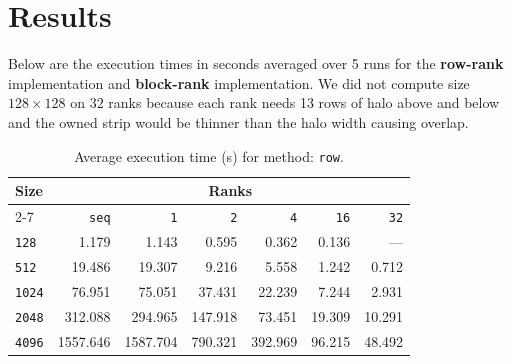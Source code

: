 \documentclass[11pt]{article}
\begin{document}
\section{Results}

Below are the execution times in seconds averaged over 5 runs for the \textbf{row-rank} implementation and \textbf{block-rank} implementation. We did not compute size $128 \times 128$ on $32$ ranks because each rank needs 13 rows of halo above and below and the owned strip would be thinner than the halo width causing overlap.

\begin{table}[H]
    \centering
    \begin{tabular}{|l|r|r|r|r|r|r|} \hline
        \cellcolor{blue!10}\textbf{Size} & \multicolumn{6}{c|}{\cellcolor{blue!10}\textbf{Ranks}} 
        \\ \cline{2-7}
        \cellcolor{blue!10} & \cellcolor{blue!20}\texttt{seq} & \cellcolor{blue!20}\texttt{1} & \cellcolor{blue!20}\texttt{2} & \cellcolor{blue!20}\texttt{4} & \cellcolor{blue!20}\texttt{16} & \cellcolor{blue!20}\texttt{32} \\ \hline
        \texttt{128}  & \cellcolor{red!20}1.179   & 1.143   & 0.595   & 0.362   & \cellcolor{green!20}0.136  & ---     \\ \hline
        \texttt{512}  & \cellcolor{red!20}19.486  & 19.307  & 9.216   & 5.558   & 1.242   & \cellcolor{green!20}0.712  \\ \hline
        \texttt{1024} & \cellcolor{red!20}76.951  & 75.051  & 37.431  & 22.239  & 7.244   & \cellcolor{green!20}2.931  \\ \hline
        \texttt{2048} & \cellcolor{red!20}312.088 & 294.965 & 147.918 & 73.451  & 19.309  & \cellcolor{green!20}10.291 \\ \hline
        \texttt{4096} & \cellcolor{red!20}1557.646 & 1587.704 & 790.321 & 392.969 & 96.215  & \cellcolor{green!20}48.492 \\ \hline
    \end{tabular}
    \caption{Average execution time (s) for method: \texttt{row}.}
\end{table}
\end{document}
